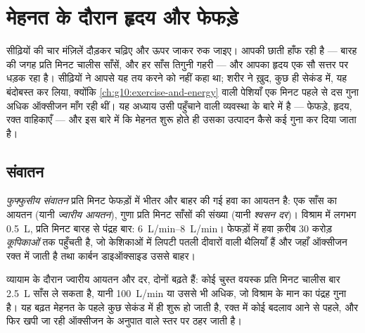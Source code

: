 \chapter{मेहनत के दौरान हृदय और फेफड़े}\label{ch:g10:heart-lungs-effort}

सीढ़ियों की चार मंज़िलें दौड़कर चढ़िए और ऊपर जाकर रुक जाइए। आपकी छाती
हाँफ रही है --- बारह की जगह प्रति मिनट चालीस साँसें, और हर साँस तिगुनी
गहरी --- और आपका हृदय एक सौ सत्तर पर धड़क रहा है। सीढ़ियों ने आपसे यह तय
करने को नहीं कहा था; शरीर ने ख़ुद, कुछ ही सेकंड में, यह बंदोबस्त कर लिया,
क्योंकि \cref{ch:g10:exercise-and-energy} वाली पेशियाँ एक मिनट पहले से दस
गुना अधिक ऑक्सीजन माँग रही थीं। यह अध्याय उसी पहुँचाने वाली व्यवस्था के
बारे में है --- फेफड़े, हृदय, रक्त वाहिकाएँ --- और इस बारे में कि मेहनत
शुरू होते ही उसका उत्पादन कैसे कई गुना कर दिया जाता है।

\section{संवातन}

\begin{definition}[संवातन]\label{def:g10:heart-lungs-effort:ventilation}
\emph{फुफ्फुसीय संवातन} प्रति मिनट फेफड़ों में भीतर और
बाहर की गई हवा का आयतन है: एक साँस का आयतन (यानी \emph{ज्वारीय आयतन}),
गुणा प्रति मिनट साँसों की संख्या (यानी \emph{श्वसन दर})। विश्राम में
लगभग \qty{0.5}{L}, प्रति मिनट बारह से पंद्रह बार:
\qtyrange{6}{8}{L/min}। फेफड़ों में हवा क़रीब 30 करोड़
\emph{कूपिकाओं} तक पहुँचती है, जो केशिकाओं में लिपटी पतली
दीवारों वाली थैलियाँ हैं और जहाँ ऑक्सीजन रक्त में जाती है तथा कार्बन
डाइऑक्साइड उससे बाहर।
\end{definition}

\begin{proposition}[व्यायाम के दौरान संवातन]\label{prop:g10:heart-lungs-effort:vent-exercise}
व्यायाम के दौरान ज्वारीय आयतन और दर, दोनों बढ़ते हैं: कोई चुस्त वयस्क
प्रति मिनट चालीस बार \qty{2.5}{L} साँस ले सकता है, यानी \qty{100}{L/min}
या उससे भी अधिक, जो विश्राम के मान का पंद्रह गुना है। यह बढ़त मेहनत के
पहले कुछ सेकंड में ही शुरू हो जाती है, रक्त में कोई बदलाव आने से पहले, और
फिर खपी जा रही ऑक्सीजन के अनुपात वाले स्तर पर ठहर जाती है।
\end{proposition}
\admitted

